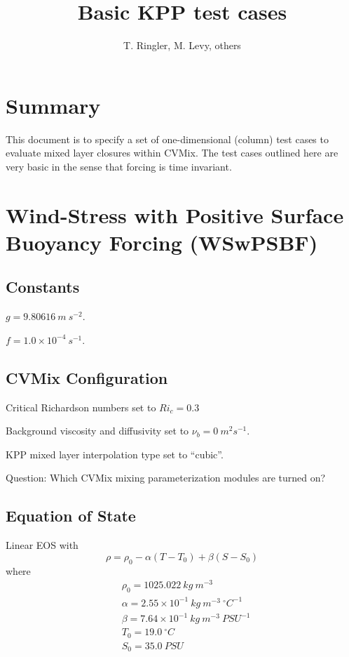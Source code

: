 \documentclass[fleqn, 12pt]{report}
\begin{document}
\title{
Basic KPP test cases}
\author{T. Ringler, M. Levy, others}

\maketitle
\tableofcontents


\chapter{Summary}
This document is to specify a set of one-dimensional (column) test cases to evaluate mixed layer closures within CVMix. The test cases outlined here are very basic in the sense that forcing is time invariant.

\chapter{Wind-Stress with Positive Surface Buoyancy Forcing (WSwPSBF)}

\section{Constants}

$g=9.80616 \ m \ s^{-2}$.

$f=1.0 \times 10^{-4} \ s^{-1}$.

\section{CVMix Configuration}

Critical Richardson numbers set to $Ri_c = 0.3$

Background viscosity and diffusivity set to $\nu_b = 0~m^2 s^{-1}$.

KPP mixed layer interpolation type set to ``cubic''.

Question: Which CVMix mixing parameterization modules are turned on?

\section{Equation of State}
Linear EOS with
\begin{equation}
\rho = \rho_0 - \alpha (T-T_0) + \beta (S-S_0)
\end{equation}
where 
\begin{align*}
&\rho_0=1025.022 \ kg \ m^{-3} \\
&\alpha=2.55\times10^{-1} \ kg \ m^{-3} \ ^{\circ}C^{-1} \\
&\beta=7.64\times10^{-1} \ kg \ m^{-3} \ {PSU}^{-1} \\
&T_0= 19.0 \ ^{\circ}C \\
&S_0=35.0 \ PSU 
\end{align*}
\end{document}

